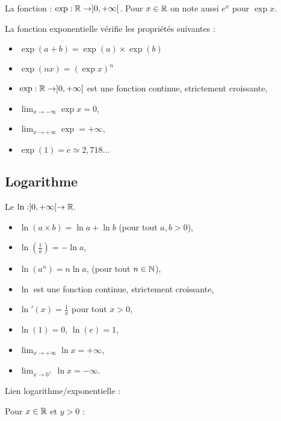 \documentclass[10pt,class=article,crop=false]{standalone}
\begin{document}
\begin{multicols}{2}
La fonction  : $\exp : \mathbb{R} \to   ]0,+\infty[$.
Pour $x \in \mathbb{R}$ on note aussi $e^x$ pour $\exp x$.



La fonction exponentielle vérifie les propriétés suivantes :
\begin{itemize}
	
	\item $\exp(a+b) = \exp(a) \times \exp(b)$
	
	\item $\exp(nx) = (\exp x)^n$
	
	\item $\exp : \mathbb{R} \to   ]0,+ \infty[$ est une fonction continue, strictement croissante,
	
	\item $\lim_{x\to-\infty} \exp x = 0$,
	
	\item $\lim_{x\to +\infty} \exp = +\infty$,
	
	\item $\exp(1) = e \simeq 2,718\ldots$
\end{itemize}


\subsection{Logarithme}


Le  $\ln : ]0,+\infty[ \to \mathbb{R}$.



\begin{itemize}
	\item $\ln (a \times b) = \ln a + \ln b$ (pour tout $a,b >0$),
	\item $\ln(\frac 1 a) = - \ln a$,
	\item $\ln(a^n) = n \ln a$, (pour tout $n \in \mathbb{N}$),
	\item $\ln$ est une fonction continue, strictement croissante,
	\item $\ln'(x) = \frac 1x$ pour tout $x>0$,
	\item $\ln(1) = 0$, $\ln(e)=1$,
	\item $\lim_{x\to +\infty} \ln x = +\infty$,
	\item $\lim_{x\to 0^+} \ln x = -\infty$.
\end{itemize}

\medskip

Lien logarithme/exponentielle :



Pour $x \in \mathbb{R}$ et $y>0$ :


\end{multicols}
\end{document}
